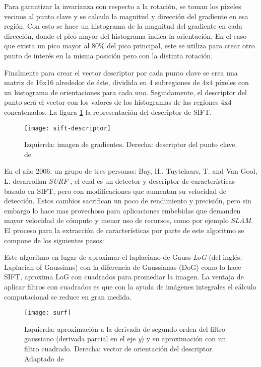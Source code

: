 Para garantizar la invarianza con respecto a la rotación, se toman los píxeles vecinos al punto clave y se calcula la magnitud y dirección del gradiente en esa región. Con esto se hace un histograma de la magnitud del gradiente en cada dirección, donde el pico mayor del histograma indica la orientación. En el caso que exista un pico mayor al 80\% del pico principal, este se utiliza para crear otro punto de interés en la misma posición pero con la distinta rotación.

Finalmente para crear el vector descriptor por cada punto clave se crea una matriz de 16x16 alrededor de éste, dividida en 4 subregiones de 4x4 píxeles con un histograma de orientaciones para cada uno. Seguidamente, el descriptor del punto será el vector con los valores de los histogramas de las regiones 4x4 concatenados. La figura \ref{imagen:descriptor} la representación del descriptor de SIFT.

\begin{figure}[H]
	\centering
	\texttt{[image: sift-descriptor]}
	\caption[Descriptor SIFT]{Izquierda: imagen de gradientes. Derecha: descriptor del punto clave. de \cite{sift}}
	\label{imagen:descriptor}
\end{figure}


En el año 2006, un grupo de tres personas: Bay, H., Tuytelaars, T. and Van Gool, L. desarrollan \textit{SURF} \cite{surf}, el cual es un detector y descriptor de características basado en SIFT, pero con modificaciones que aumentan su velocidad de detección. Estos cambios sacrifican un poco de rendimiento y precisión, pero sin embargo lo hace mas provechoso para aplicaciones embebidas que demanden mayor velocidad de cómputo y menor uso de recursos, como por ejemplo \textit{SLAM}. El proceso para la extracción de características por parte de este algoritmo se compone de los siguientes pasos:

Este algoritmo en lugar de aproximar el laplaciano de Gauss \textit{LoG} (del inglés: Laplacian of Gaussians) con la diferencia de Gaussianas (DoG) como lo hace SIFT, aproxima LoG con cuadrados para promediar la imagen. La ventaja de aplicar filtros con cuadrados es que con la ayuda de imágenes integrales el cálculo computacional se reduce en gran medida.

\begin{figure}[H]
	\centering
	\texttt{[image: surf]}
	\caption[Detector y descriptor SURF]{Izquierda: aproximación a la derivada de segundo orden del filtro gaussiano (derivada parcial en el eje \textit{y}) y su aproximación con un filtro cuadrado. Derecha: vector de orientación del descriptor. Adaptado de \cite{surf}}
	\label{imagen:surf}
\end{figure}

